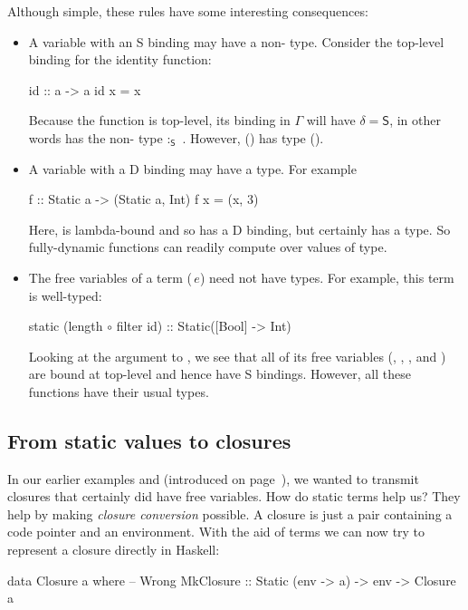 \documentclass{sigplanconf}
\begin{document}
Although simple, these rules have some interesting consequences:
\begin{itemize}
\item A variable with an \textsf{S} binding may have a non- type. Consider the 
top-level binding for the identity function:
\begin{code}
  id :: a -> a
  id x = x
\end{code}
Because the function  is top-level, its binding
in $\Gamma$ will have $\delta=\textsf{S}$, in other words  has the
non- type  $:_{\textsf{S}}$ . However, ($\!$) has type ($\!$).

\item A variable with a \textsf{D} binding may have a  type.  For example
\begin{code}
  f :: Static a -> (Static a, Int)
  f x = (x, 3)
\end{code}
Here,  is lambda-bound and so has a \textsf{D} binding,  but  certainly has
a  type.  So fully-dynamic functions
can readily compute over values of  type.

\item The free variables of a term ($\!$$\,e$) need not have
 types. For example, this term is well-typed:
\par{\small
\begin{code}
static (length$\,\circ\,$filter id) :: Static([Bool] -> Int)
\end{code}
}
Looking at the argument to , we see that all of its free variables (, \textt{($\circ$)},
, and ) are bound at top-level and hence have \textsf{S}
bindings. However, all these functions have their usual types.
\end{itemize}
\subsection{From static values to closures}

In our earlier examples  and
 (introduced on page~\pageref{p_sendfunc}), we wanted to transmit closures
that certainly did have free variables.  How do static terms help us?
They help by making \emph{closure conversion} possible. A closure
is just a pair containing a code pointer and an environment.  With the aid of
 terms we can now try to represent a closure directly in Haskell:
\begin{code}
data Closure a where   -- Wrong
  MkClosure :: Static (env -> a) -> env -> Closure a
\end{code}
\end{document}
